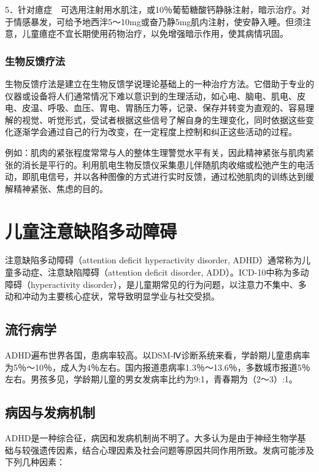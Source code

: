 5．针对癔症　可选用注射用水肌注，或10％葡萄糖酸钙静脉注射，暗示治疗。对于情感暴发，可给予地西泮5～10mg或奋乃静5mg肌内注射，使安静入睡。但须注意，儿童癔症不宜长期使用药物治疗，以免增强暗示作用，使其病情巩固。

\subsubsection{生物反馈疗法}

生物反馈疗法是建立在生物反馈学说理论基础上的一种治疗方法。它借助于专业的仪器或设备将人们通常情况下难以意识到的生理活动，如心电、脑电、肌电、皮电、皮温、呼吸、血压、胃电、胃肠压力等，记录、保存并转变为直观的、容易理解的视觉、听觉形式，受试者根据这些信号了解自身的生理变化，同时依据这些变化逐渐学会通过自己的行为改变，在一定程度上控制和纠正这些活动的过程。

例如：肌肉的紧张程度常常与人的整体生理警觉水平有关，因此精神紧张与肌肉紧张的消长是平行的。利用肌电生物反馈仪采集患儿伴随肌肉收缩或松弛产生的电活动，即肌电信号，并以各种图像的方式进行实时反馈，通过松弛肌肉的训练达到缓解精神紧张、焦虑的目的。

\section{儿童注意缺陷多动障碍}

注意缺陷多动障碍（attention deficit hyperactivity disorder,
ADHD）通常称为儿童多动症、注意缺陷障碍（attention deficit disorder,
ADD）。ICD-10中称为多动障碍（hyperactivity
disorder），是儿童期常见的行为问题，以注意力不集中、多动和冲动为主要核心症状，常导致明显学业与社交受损。

\subsection{流行病学}

ADHD遍布世界各国，患病率较高。以DSM-Ⅳ诊断系统来看，学龄期儿童患病率为5％～10％，成人为4％左右。国内报道患病率1.3％～13.6％，多数城市报道5％左右。男孩多见，学龄期儿童的男女发病率比约为9:1，青春期为（2～3）:1。

\subsection{病因与发病机制}

ADHD是一种综合征，病因和发病机制尚不明了。大多认为是由于神经生物学基础与较强遗传因素，结合心理因素及社会问题等原因共同作用所致。发病可能涉及下列几种因素：

